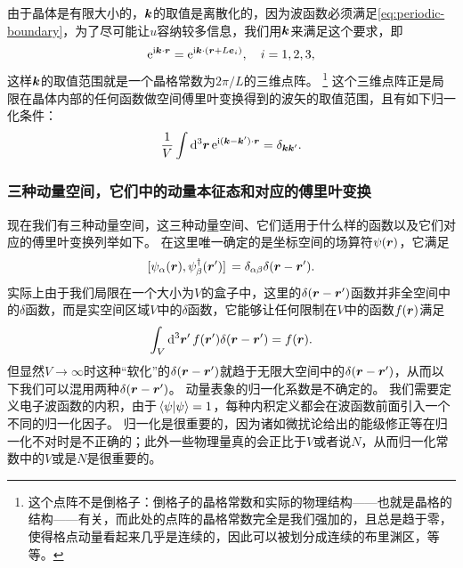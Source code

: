 由于晶体是有限大小的，$\vb*{k}$的取值是离散化的，因为波函数必须满足\eqref{eq:periodic-boundary}，为了尽可能让$u$容纳较多信息，我们用$\vb*{k}$来满足这个要求，即
\[
    \mathrm{e}^{\mathrm{i} \vb*{k} \cdot \vb*{r}} = \mathrm{e}^{\mathrm{i} \vb*{k} \cdot (\vb*{r} + L \vb*{e}_i)}, \quad i = 1, 2, 3,
\]
这样$\vb*{k}$的取值范围就是一个晶格常数为$2\pi / L$的三维点阵。%
\footnote{这个点阵不是倒格子：倒格子的晶格常数和实际的物理结构——也就是晶格的结构——有关，而此处的点阵的晶格常数完全是我们强加的，且总是趋于零，使得格点动量看起来几乎是连续的，因此可以被划分成连续的布里渊区，等等。
}%
这个三维点阵正是局限在晶体内部的任何函数做空间傅里叶变换得到的波矢的取值范围，且有如下归一化条件：
\begin{equation}
    \frac{1}{V} \int \dd[3]{\vb*{r}} \mathrm{e}^{\mathrm{i} (\vb*{k} - \vb*{k}') \cdot \vb*{r}} = \delta_{\vb*{k}\vb*{k}'}.
\end{equation}

\subsubsection{三种动量空间，它们中的动量本征态和对应的傅里叶变换}\label{sec:momentum-space-inner-product}

现在我们有三种动量空间，这三种动量空间、它们适用于什么样的函数以及它们对应的傅里叶变换列举如下。
在这里唯一确定的是坐标空间的场算符$\psi(\vb*{r})$，它满足
\[
    \comm*{\psi_\alpha(\vb*{r})}{\psi^\dagger_\beta(\vb*{r}')} = \delta_{\alpha \beta} \delta(\vb*{r} - \vb*{r}').
\]
实际上由于我们局限在一个大小为$V$的盒子中，这里的$\delta(\vb*{r} - \vb*{r}')$函数并非全空间中的$\delta$函数，而是实空间区域$V$中的$\delta$函数，它能够让任何限制在$V$中的函数$f(\vb*{r})$满足
\[
    \int_V \dd[3]{\vb*{r}'} f(\vb*{r}') \delta(\vb*{r} - \vb*{r}') = f(\vb*{r}).
\]
但显然$V \to \infty$时这种“软化”的$\delta(\vb*{r} - \vb*{r}')$就趋于无限大空间中的$\delta(\vb*{r} - \vb*{r}')$，从而以下我们可以混用两种$\delta(\vb*{r} - \vb*{r}')$。
动量表象的归一化系数是不确定的。
我们需要定义电子波函数的内积，由于$\braket*{\psi}{\psi} = 1$，每种内积定义都会在波函数前面引入一个不同的归一化因子。
归一化是很重要的，因为诸如微扰论给出的能级修正等在归一化不对时是不正确的；此外一些物理量真的会正比于$V$或者说$N$，从而归一化常数中的$V$或是$N$是很重要的。

